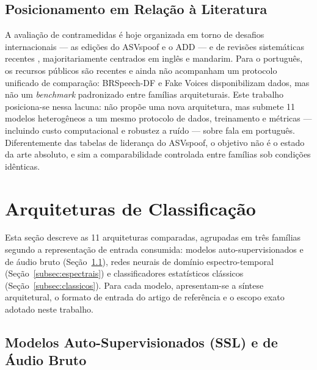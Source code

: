 \documentclass[12pt,a4paper]{article}
\begin{document}
\subsection{Posicionamento em Relação à Literatura}
\label{sec:posicionamento}

A avaliação de contramedidas é hoje organizada em torno de desafios
internacionais --- as edições do ASVspoof \cite{wu2015asvspoof,
todisco2019asvspoof, yamagishi2021asvspoof, wang2024asvspoof5} e o ADD
\cite{yi2022add} --- e de revisões sistemáticas recentes
\cite{heidari2024deepfake}, majoritariamente centrados em inglês e mandarim.
Para o português, os recursos públicos são recentes e ainda não acompanham um
protocolo unificado de comparação: BRSpeech-DF \cite{brspeechdf_card} e Fake
Voices \cite{fakevoices_card} disponibilizam dados, mas não um
\textit{benchmark} padronizado entre famílias arquiteturais. Este trabalho
posiciona-se nessa lacuna: não propõe uma nova arquitetura, mas submete
\num{11} modelos heterogêneos a um mesmo protocolo de dados, treinamento e
métricas --- incluindo custo computacional e robustez a ruído --- sobre fala
em português. Diferentemente das tabelas de liderança do ASVspoof, o objetivo
não é o estado da arte absoluto, e sim a comparabilidade controlada entre
famílias sob condições idênticas.

\newpage

\section{Arquiteturas de Classificação}
\label{sec:arquiteturas}

Esta seção descreve as \num{11} arquiteturas comparadas, agrupadas em três
famílias segundo a representação de entrada consumida: modelos
auto-supervisionados e de áudio bruto (Seção~\ref{subsec:ssl_raw}), redes
neurais de domínio espectro-temporal (Seção~\ref{subsec:espectrais}) e
classificadores estatísticos clássicos (Seção~\ref{subsec:classicos}). Para
cada modelo, apresentam-se a síntese arquitetural, o formato de entrada do
artigo de referência e o escopo exato adotado neste trabalho.

\subsection{Modelos Auto-Supervisionados (SSL) e de Áudio Bruto}
\label{subsec:ssl_raw}
\end{document}
